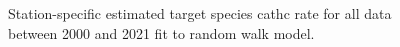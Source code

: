 \documentclass[12pt]{article}\usepackage[]{graphicx}\usepackage[]{color}
\begin{document}
\begin{figure}[htb]

{\centering {} 

}

\caption{Station-specific estimated target species cathc rate for all data between 2000 and 2021 fit to random walk model.}\label{fig:target-spat}
\end{figure}
\end{document}
